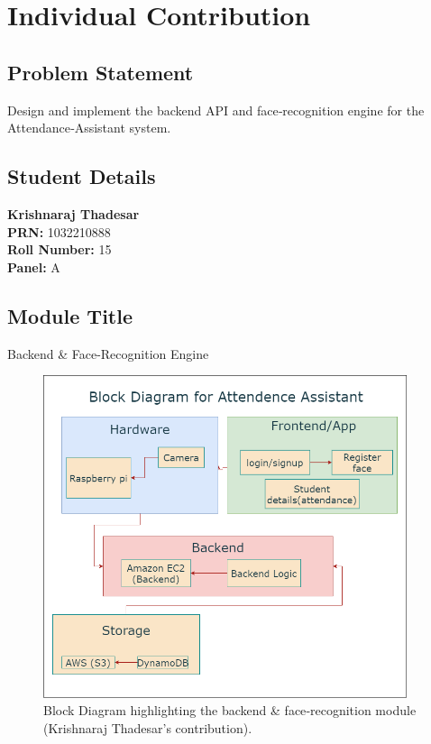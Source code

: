 \documentclass[openany]{report}
\begin{document}
\chapter{Individual Contribution}
\section{Problem Statement}
Design and implement the backend API and face‐recognition engine for the Attendance‐Assistant system.

\section{Student Details}
\textbf{Krishnaraj Thadesar} \\
\textbf{PRN:} 1032210888 \\
\textbf{Roll Number:} 15 \\
\textbf{Panel:} A \\

\section{Module Title}
Backend \& Face-Recognition Engine

\begin{figure}[H]
    \centering
    \includegraphics[width=0.95\textwidth]{../imgs/block diagram.png}
    \caption{Block Diagram highlighting the backend \& face‐recognition module (Krishnaraj Thadesar’s contribution).}
    \label{fig:block_diagram_krishnaraj}
\end{figure}
\end{document}
